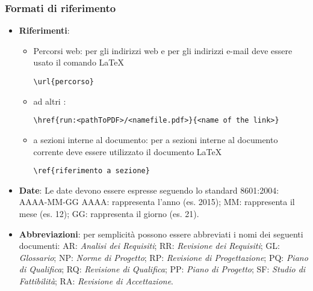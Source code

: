\documentclass{scalatekids-article}
\begin{document}
\subsubsection{Formati di riferimento}

\begin{itemize}
    \item \textbf{Riferimenti}:
        \begin{itemize}
            \item Percorsi web: per gli indirizzi web e per gli indirizzi e-mail deve essere usato il comando \LaTeX\xspace
                \begin{center}
                    \verb=\url{percorso}=
                \end{center}
            \item {} ad altri :
                \begin{center}
                    \verb=\href{run:<pathToPDF>/<namefile.pdf>}{<name of the link>}=
                \end{center}
            \item {} a sezioni interne al documento: per  a sezioni interne al documento corrente deve essere utilizzato il documento \LaTeX\xspace
                \begin{center}
                    \verb=\ref{riferimento a sezione}=
                \end{center}
        \end{itemize}
    \item \textbf{Date}: Le date devono essere espresse seguendo lo standard \textit{} 8601:2004:
        AAAA-MM-GG
        AAAA: rappresenta l'anno (es. 2015);
        MM:	rappresenta il mese (es. 12);
        GG: rappresenta il giorno (es. 21).

    \item \textbf{Abbreviazioni}: per semplicità possono essere abbreviati i nomi dei seguenti documenti:
        AR: \textit{Analisi dei Requisiti};
        RR: \textit{Revisione dei Requisiti};
        GL: \textit{Glossario};
        NP: \textit{Norme di Progetto};
        RP: \textit{Revisione di Progettazione};
        PQ: \textit{Piano di Qualifica};
        RQ: \textit{Revisione di Qualifica};
        PP: \textit{Piano di Progetto};
        SF: \textit{Studio di Fattibilità};
        RA: \textit{Revisione di Accettazione}.


\end{itemize}
\end{document}
